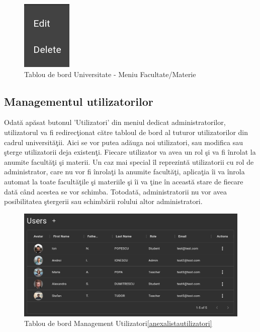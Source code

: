 \documentclass[12pt, a4paper, oneside, romanian]{teza-upb}
\begin{document}
\begin{figure}[H]
\centering
\includegraphics*[width=0.15\columnwidth]{tablou-de-bord-universitate-meniu-facultate}
\caption{Tablou de bord Universitate - Meniu Facultate/Materie}
\label{tablou-de-bord-universitate-meniu-facultate}
\end{figure}

\subsection{Managementul utilizatorilor}

Odată apăsat butonul 'Utilizatori' din meniul dedicat administratorilor, utilizatorul va fi redirecţionat către tabloul de bord al tuturor utilizatorilor din cadrul universităţii. Aici se vor putea adăuga noi utilizatori, sau modifica sau şterge utilizatorii deja existenţi. Fiecare utilizator va avea un rol şi va fi înrolat la anumite facultăţi şi materii. Un caz mai special îl reprezintă utilizatorii cu rol de administrator, care nu vor fi înrolaţi la anumite facultăţi, aplicaţia îi va înrola automat la toate facultăţile şi materiile şi îi va ţine în această stare de fiecare dată când acestea se vor schimba. Totodată, administratorii nu vor avea posibilitatea ştergerii sau schimbării rolului altor administratori.

\begin{figure}[H]
\centering
\includegraphics*[width=\columnwidth]{tablou-de-bord-management-utilizatori}
\caption{Tablou de bord Management Utilizatori\ref{anexalistautilizatori}}
\label{tablou-de-bord-management-utilizatori}
\end{figure}
\end{document}
